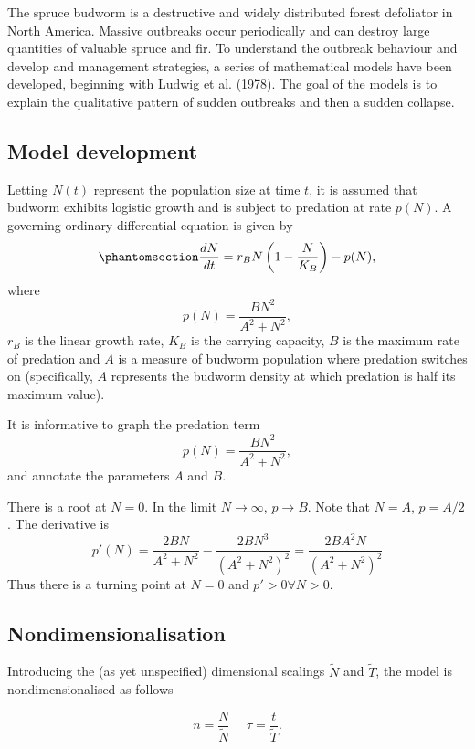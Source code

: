 \documentclass[
  letterpaper,
  DIV=11,
  numbers=noendperiod]{scrreprt}
\begin{document}
The spruce budworm is a destructive and widely distributed forest
defoliator in North America. Massive outbreaks occur periodically and
can destroy large quantities of valuable spruce and fir. To understand
the outbreak behaviour and develop and management strategies, a series
of mathematical models have been developed, beginning with {Ludwig et
al.} (1978). The goal of the models is to explain the qualitative
pattern of sudden outbreaks and then a sudden collapse.

\subsection{Model development}\label{model-development-2}

Letting \(N(t)\) represent the population size at time \(t\), it is
assumed that budworm exhibits logistic growth and is subject to
predation at rate \(p(N)\). A governing ordinary differential equation
is given by
\begin{equation}\protect\phantomsection\label{eq-sprucebudworm}{
\frac{dN }{dt}= r_B N\left(1-\frac{N}{K_B}\right)-p(N),
}\end{equation} where \[
p(N) =\frac{B N^2}{A^2 +N^2},
\] \(r_B\) is the linear growth rate, \(K_B\) is the carrying capacity,
\(B\) is the maximum rate of predation and \(A\) is a measure of budworm
population where predation switches on (specifically, \(A\) represents
the budworm density at which predation is half its maximum value).

It is informative to graph the predation term \[
p(N) =\frac{B N^2}{A^2 +N^2},
\] and annotate the parameters \(A\) and \(B\).

There is a root at \(N=0\). In the limit \(N\rightarrow \infty\),
\(p \rightarrow B\). Note that \(N=A\), \(p=A/2\). The derivative is \[
p'(N)=\frac{2BN}{A^2+N^2} - \frac{2BN^3}{(A^2+N^2)^2} =  \frac{2BA^2N}{(A^2+N^2)^2}
\] Thus there is a turning point at \(N=0\) and \(p'>0 \forall N>0\).

\subsection{Nondimensionalisation}\label{nondimensionalisation-2}

Introducing the (as yet unspecified) dimensional scalings \(\tilde{N}\)
and \(\tilde{T}\), the model is nondimensionalised as follows

\[
n=\frac{N}{\tilde{N}} \ \ \ \ \ \ \tau=\frac{t}{\tilde{T}}.
\]
\end{document}
